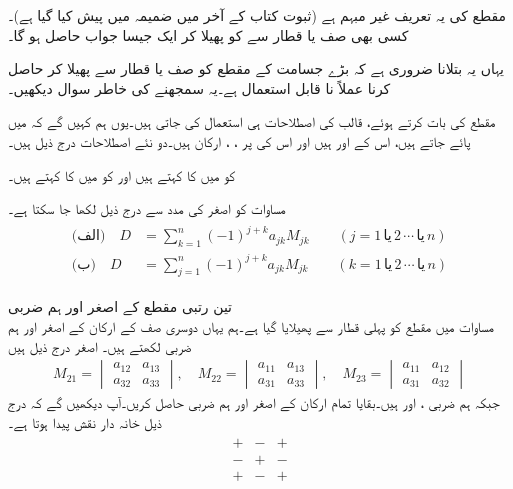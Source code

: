 مقطع کی یہ تعریف غیر مبہم ہے (ثبوت کتاب کے آخر میں ضمیمہ  میں پیش کیا گیا ہے)۔ کسی بھی صف یا قطار سے  کو پھیلا کر ایک جیسا جواب حاصل ہو گا۔

یہاں یہ بتلانا ضروری ہے کہ بڑے جسامت کے مقطع کو صف یا قطار سے پھیلا کر حاصل کرنا  عملاً نا قابل استعمال ہے۔یہ سمجھنے کی خاطر سوال  دیکھیں۔

مقطع کی بات کرتے ہوئے، قالب کی اصطلاحات ہی استعمال کی جاتی ہیں۔یوں ہم کہیں گے کہ  میں    پائے جاتے ہیں، اس کے   اور   ہیں اور اس کی  پر ، ،  ارکان ہیں۔دو نئے اصطلاحات درج ذیل ہیں۔

 کو  میں  کا  کہتے ہیں اور  کو  میں  کا  کہتے ہیں۔

مساوات  کو اصغر کی مدد سے درج ذیل لکھا جا سکتا ہے۔
\begin{gather}
\begin{aligned}\label{مساوات_الجبرا_مقطع_مجموعہ}
\text{(الف)}\quad D&=\sum_{k=1}^{n} (-1)^{j+k}a_{jk}M_{jk}\quad \quad (j=1\,\text{یا}\, 2\,\cdots \,\text{یا}\, n)\\
\text{(ب)}\quad D&=\sum_{j=1}^{n} (-1)^{j+k}a_{jk}M_{jk}\quad \quad (k=1\,\text{یا}\, 2\,\cdots \,\text{یا}\, n)
\end{aligned}
\end{gather}

\quad تین رتبی مقطع کے اصغر اور ہم ضربی\\
مساوات  میں مقطع کو پہلی قطار سے پھیلایا گیا ہے۔ہم یہاں دوسری صف کے ارکان کے اصغر اور ہم ضربی لکھتے ہیں۔ اصغر درج ذیل ہیں
\begin{align*}
M_{21}=
\begin{vmatrix}
a_{12}&a_{13}\\a_{32}&a_{33}
\end{vmatrix},\quad
M_{22}=
\begin{vmatrix}
a_{11}&a_{13}\\a_{31}&a_{33}
\end{vmatrix},\quad
M_{23}=
\begin{vmatrix}
a_{11}&a_{12}\\a_{31}&a_{32}
\end{vmatrix}
\end{align*}  
جبکہ ہم ضربی ،  اور  ہیں۔بقایا تمام ارکان کے اصغر اور ہم ضربی حاصل کریں۔آپ دیکھیں گے کہ  درج ذیل خانہ دار نقش پیدا ہوتا ہے۔
\begin{align*}
\begin{matrix}
+&-&+\\
-&+&-\\
+&-&+
\end{matrix}
\end{align*}

